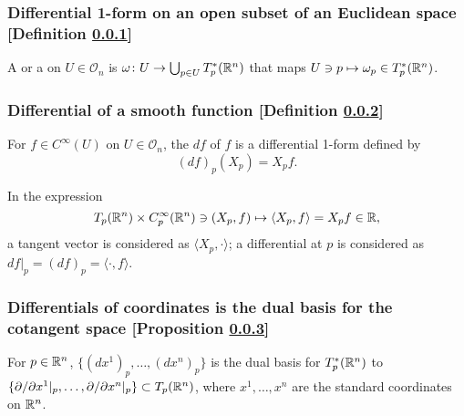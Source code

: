 \subsubsection{Differential 1-form on an open subset of an Euclidean space [Definition \ref{differential-1-form-on-an-open-subset-of-an-euclidean-space}]}\label{differential-1-form-on-an-open-subset-of-an-euclidean-space}
A  or a  on $U \in \mathcal{O}_n$ is $\omega \colon U \to \bigcup_{p \in U} T^*_p (\mathbb{R}^n)$ that maps $U \ni p \mapsto \omega_p \in T^*_p (\mathbb{R}^n)$.

\subsubsection{Differential of a smooth function [Definition \ref{differential-of-a-smooth-function}]}\label{differential-of-a-smooth-function}
For $f \in C^\infty (U)$ on $U \in \mathcal{O}_n$, the  $df$ of $f$ is a differential 1-form defined by
\[
(df)_p (X_p) = X_p f.
\]


In the expression
\[
T_p(\mathbb{R}^n) \times C^\infty_p (\mathbb{R}^n) \ni (X_p, f) \mapsto \langle X_p, f \rangle = X_p f \in \mathbb{R},
\]
a tangent vector is considered as $\langle X_p, \cdot \rangle$; a differential at $p$ is considered as $df|_p = (df)_p = \langle \cdot, f \rangle$.


\subsubsection{Differentials of coordinates is the dual basis for the cotangent space [Proposition \ref{differentials-of-the-coordinates-is-the-dual-basis-for-the-cotangent-space}]}\label{differentials-of-the-coordinates-is-the-dual-basis-for-the-cotangent-space}
For $p \in \mathbb{R}^n$, $\{ (dx^1)_p, \dotsc, (dx^n)_p \} $ is the dual basis for $T_p^* (\mathbb{R}^n)$ to $\{ \partial / \partial x^1|_p, \dotsc, \partial/\partial x^n|_p \} \subset T_p (\mathbb{R}^n)$, where $x^1, \dotsc, x^n$ are the standard coordinates on $\mathbb{R}^n$.